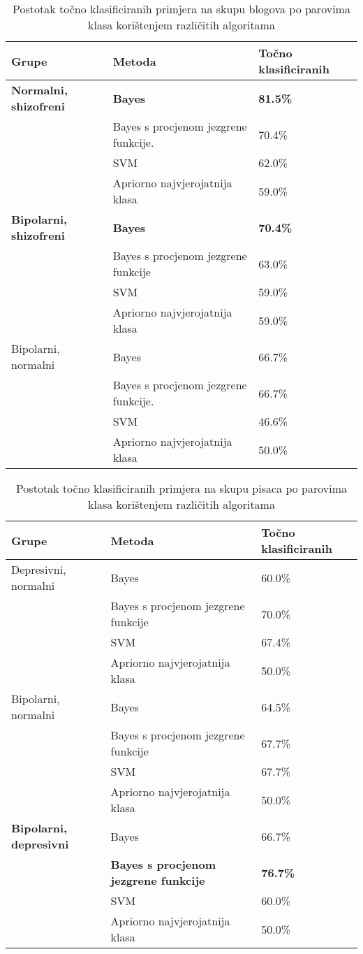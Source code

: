 \documentclass[10pt, a4paper]{article}
\begin{document}
\begin{table*}
\caption{Postotak točno klasificiranih primjera na skupu blogova po parovima klasa korištenjem različitih algoritama}
\label{lab:rezultatiBlogGrupa}
\begin{center}
\begin{tabular}{lll}
\toprule
Grupe & Metoda & Točno klasificiranih\\
\midrule
\textbf{Normalni, shizofreni} & \textbf{Bayes} & \textbf{81.5\%}\\
 & Bayes s procjenom jezgrene funkcije. & 70.4\%\\
 & SVM & 62.0\%\\
 & Apriorno najvjerojatnija klasa & 59.0\%\\
\midrule
 \textbf{Bipolarni, shizofreni} &  \textbf{Bayes} &  \textbf{70.4\%}\\
 & Bayes s procjenom jezgrene funkcije & 63.0\%\\
 & SVM & 59.0\%\\
 & Apriorno najvjerojatnija klasa & 59.0\%\\
\midrule
Bipolarni, normalni & Bayes & 66.7\%\\
 & Bayes s procjenom jezgrene funkcije. & 66.7\%\\
 & SVM & 46.6\%\\
 & Apriorno najvjerojatnija klasa & 50.0\%\\
 \bottomrule
 \end{tabular}
 \end{center}
 \end{table*}
\begin{table*}
\caption{Postotak točno klasificiranih primjera na skupu pisaca po parovima klasa korištenjem različitih algoritama}
\label{tab:rezultPisciGrupa}
\begin{center}
\begin{tabular}{lll}
\toprule
Grupe & Metoda & Točno klasificiranih\\
\midrule
Depresivni, normalni & Bayes & 60.0\%\\
 & Bayes s procjenom jezgrene funkcije & 70.0\%\\
 & SVM & 67.4\%\\
  & Apriorno najvjerojatnija klasa & 50.0\%\\
\midrule
Bipolarni, normalni & Bayes & 64.5\%\\
 & Bayes s procjenom jezgrene funkcije & 67.7\%\\
 & SVM & 67.7\%\\
  & Apriorno najvjerojatnija klasa & 50.0\%\\
\midrule
 \textbf{Bipolarni, depresivni} &  Bayes &  66.7\%\\
 &  \textbf{Bayes s procjenom jezgrene funkcije} &  \textbf{76.7\%}\\
  & SVM & 60.0\%\\
   & Apriorno najvjerojatnija klasa & 50.0\%\\
\bottomrule
\end{tabular}
\end{center}
\end{table*}
\end{document}
